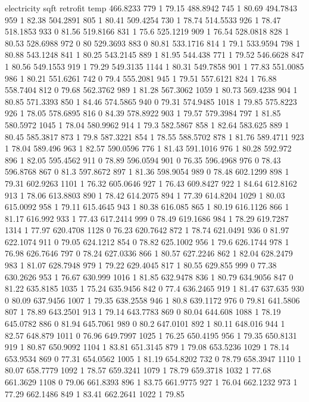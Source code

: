 electricity	sqft	retrofit	temp
466.8233	779	1	79.15
488.8942	745	1	80.69
494.7843	959	1	82.38
504.2891	805	1	80.41
509.4254	730	1	78.74
514.5533	926	1	78.47
518.1853	933	0	81.56
519.8166	831	1	75.6
525.1219	909	1	76.54
528.0818	828	1	80.53
528.6988	972	0	80
529.3693	883	0	80.81
533.1716	814	1	79.1
533.9594	798	1	80.88
543.1248	841	1	80.25
543.2145	889	1	81.95
544.438	771	1	79.52
546.6628	847	1	80.56
549.1553	919	1	79.29
549.3135	1144	1	80.31
549.7858	901	1	77.83
551.0085	986	1	80.21
551.6261	742	0	79.4
555.2081	945	1	79.51
557.6121	824	1	76.88
558.7404	812	0	79.68
562.3762	989	1	81.28
567.3062	1059	1	80.73
569.4238	904	1	80.85
571.3393	850	1	84.46
574.5865	940	0	79.31
574.9485	1018	1	79.85
575.8223	926	1	78.05
578.6895	816	0	84.39
578.8922	903	1	79.57
579.3984	797	1	81.85
580.5972	1045	1	78.04
580.9962	914	1	79.3
582.5867	858	1	82.64
583.625	889	1	80.45
585.3817	873	1	79.8
587.3221	854	1	78.55
588.5702	878	1	81.76
589.4711	923	1	78.04
589.496	963	1	82.57
590.0596	776	1	81.43
591.1016	976	1	80.28
592.972	896	1	82.05
595.4562	911	0	78.89
596.0594	901	0	76.35
596.4968	976	0	78.43
596.8768	867	0	81.3
597.8672	897	1	81.36
598.9054	989	0	78.48
602.1299	898	1	79.31
602.9263	1101	1	76.32
605.0646	927	1	76.43
609.8427	922	1	84.64
612.8162	913	1	78.06
613.8803	890	1	78.42
614.2075	894	1	77.39
614.8204	1029	1	80.03
615.0092	958	1	79.11
615.4645	943	1	80.38
616.085	865	1	80.19
616.1126	866	1	81.17
616.992	933	1	77.43
617.2414	999	0	78.49
619.1686	984	1	78.29
619.7287	1314	1	77.97
620.4708	1128	0	76.23
620.7642	872	1	78.74
621.0491	936	0	81.97
622.1074	911	0	79.05
624.1212	854	0	78.82
625.1002	956	1	79.6
626.1744	978	1	76.98
626.7646	797	0	78.24
627.0336	866	1	80.57
627.2246	862	1	82.04
628.2479	983	1	81.07
628.7948	979	1	79.22
629.4045	817	1	80.55
629.855	999	0	77.38
630.2626	953	1	76.67
630.999	1016	1	81.85
632.9478	836	1	80.79
634.9056	847	0	81.22
635.8185	1035	1	75.24
635.9456	842	0	77.4
636.2465	919	1	81.47
637.635	930	0	80.09
637.9456	1007	1	79.35
638.2558	946	1	80.8
639.1172	976	0	79.81
641.5806	807	1	78.89
643.2501	913	1	79.14
643.7783	869	0	80.04
644.608	1088	1	78.19
645.0782	886	0	81.94
645.7061	989	0	80.2
647.0101	892	1	80.11
648.016	944	1	82.57
648.879	1011	0	76.96
649.7997	1025	1	76.25
650.4195	956	1	79.35
650.8131	919	1	80.87
650.9092	1104	1	83.81
651.3145	879	1	79.08
653.5236	1029	1	78.14
653.9534	869	0	77.31
654.0562	1005	1	81.19
654.8202	732	0	78.79
658.3947	1110	1	80.07
658.7779	1092	1	78.57
659.3241	1079	1	78.79
659.3718	1032	1	77.68
661.3629	1108	0	79.06
661.8393	896	1	83.75
661.9775	927	1	76.04
662.1232	973	1	77.29
662.1486	849	1	83.41
662.2641	1022	1	79.85
